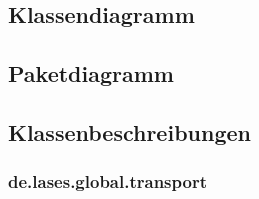 
\subsection{Klassendiagramm}

\subsection{Paketdiagramm}

\subsection{Klassenbeschreibungen}

\subsubsection{de.lases.global.transport}